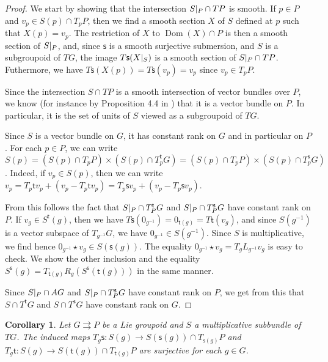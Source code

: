 \documentclass{amsart}
\newtheorem{corollary}[theorem]{Corollary}
\theoremstyle{definition}
\begin{document}
\begin{proof}
We start by showing that the intersection  $S{\arrowvert_{{P}}}\cap TP$
is smooth. If $p\in P$ and $v_p\in S(p)\cap T_pP$, then 
we find a smooth section $X$ of $S$ defined at $p$ such that
$X(p)=v_p$. The restriction of $X$ to $\operatorname{Dom}(X)\cap P$ is then a 
smooth section of $S{\arrowvert_{{P}}}$, and, since ${{\mathsf{s}}}$ is a smooth surjective submersion,
and $S$ is a subgroupoid of $TG$,
the image $T{{\mathsf{s}}}(X{\arrowvert_{{S}}})$ is a smooth section of $S{\arrowvert_{{P}}}\cap TP$. Futhermore, 
we have $T{{\mathsf{s}}}(X(p))=T{{\mathsf{s}}}(v_p)=v_p$ since $v_p\in T_pP$.

Since the intersection $S\cap TP$
 is a  smooth intersection of vector bundles 
over $P$, we know (for instance by Proposition 4.4 in \cite{JoRaSn11}) that 
it is a vector bundle  on $P$. In particular, it is the set of units of $S$ 
viewed as a subgroupoid of $TG$.

Since $S$ is a vector bundle on $G$, it has constant rank on $G$ and in particular 
on $P$. For each $p\in P$, we can write $S(p)=(S(p)\cap T_pP)\times(S(p)\cap
T^{{\mathsf{t}}}_p G)=(S(p)\cap T_pP)\times(S(p)\cap T^{{\mathsf{s}}}_p G)$.
Indeed, if $v_p\in S(p)$, then we can write $v_p=T_p{{\mathsf{t}}} v_p+(v_p-T_p{{\mathsf{t}}} v_p)
=T_p{{\mathsf{s}}} v_p+(v_p-T_p{{\mathsf{s}}} v_p)$.

From this follows the fact that $S{\arrowvert_{{P}}}\cap T^{{\mathsf{t}}}_P G$ and 
$S{\arrowvert_{{P}}}\cap T^{{\mathsf{s}}}_PG$ have constant rank on $P$.
If $v_g\in S^{{\mathsf{t}}}(g)$, then we have $T{{\mathsf{s}}}(0_{g{^{-1}}})=0_{{{\mathsf{t}}}(g)}=T{{\mathsf{t}}}(v_g)$, 
and since $S(g{^{-1}})$ is a vector subspace of $T_{g{^{-1}}}G$, we have 
$0_{g{^{-1}}}\in S(g{^{-1}})$. Since $S$ is multiplicative, we find hence
$0_{g{^{-1}}}\star v_g\in S({{\mathsf{s}}}(g))$. The equality 
$0_{g{^{-1}}}\star v_g=T_gL_{g{^{-1}}}v_g$ is easy to check. We show the other 
inclusion and the
equality  $S^{{\mathsf{s}}}(g)=T_{{{\mathsf{t}}}(g)}R_g\left(S^{{\mathsf{s}}}({{\mathsf{t}}}(g))\right)$
in the same manner.

Since $S{\arrowvert_{{P}}}\cap AG$ and $S{\arrowvert_{{P}}}\cap T_P^{{\mathsf{s}}} G$ have constant rank on $P$, we get
from this that $S\cap T^{{\mathsf{t}}} G$ and $S\cap T^{{\mathsf{s}}} G$ have constant rank on $G$.
\end{proof}

\begin{corollary}\label{surjectivity}
Let $G{{\rightrightarrows}} P$ be a  Lie groupoid 
and $S$ a multiplicative \emph{subbundle} of $TG$.
 The induced
maps $T_g{{\mathsf{s}}}:S(g)\to S({{\mathsf{s}}}(g))\cap T_{{{\mathsf{s}}}(g)}P
$ and $T_g{{\mathsf{t}}}:S(g)\to S({{\mathsf{t}}}(g))\cap T_{{{\mathsf{t}}}(g)}P$
are surjective for each $g\in G$.
\end{corollary}
\end{document}
